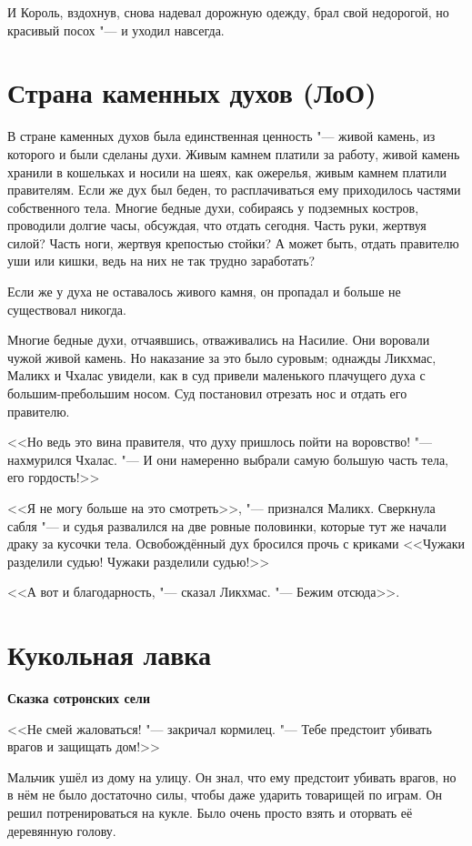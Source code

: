И Король, вздохнув, снова надевал дорожную одежду, брал свой недорогой, но красивый посох "--- и уходил навсегда.

\section{Страна каменных духов (ЛоО)}

В стране каменных духов была единственная ценность "--- живой камень, из которого и были сделаны духи.
Живым камнем платили за работу, живой камень хранили в кошельках и носили на шеях, как ожерелья, живым камнем платили правителям.
Если же дух был беден, то расплачиваться ему приходилось частями собственного тела.
Многие бедные духи, собираясь у подземных костров, проводили долгие часы, обсуждая, что отдать сегодня.
Часть руки, жертвуя силой?
Часть ноги, жертвуя крепостью стойки?
А может быть, отдать правителю уши или кишки, ведь на них не так трудно заработать?

Если же у духа не оставалось живого камня, он пропадал и больше не существовал никогда.

Многие бедные духи, отчаявшись, отваживались на Насилие.
Они воровали чужой живой камень.
Но наказание за это было суровым;
однажды Ликхмас, Маликх и Чхалас увидели, как в суд привели маленького плачущего духа с большим-пребольшим носом.
Суд постановил отрезать нос и отдать его правителю.

<<Но ведь это вина правителя, что духу пришлось пойти на воровство! "--- нахмурился Чхалас.
"--- И они намеренно выбрали самую большую часть тела, его гордость!>>

<<Я не могу больше на это смотреть>>, "--- признался Маликх.
Сверкнула сабля "--- и судья развалился на две ровные половинки, которые тут же начали драку за кусочки тела.
Освобождённый дух бросился прочь с криками <<Чужаки разделили судью! Чужаки разделили судью!>>

<<А вот и благодарность, "--- сказал Ликхмас.
"--- Бежим отсюда>>.

\section{Кукольная лавка}

\textbf{Сказка сотронских сели}

\spacing

<<Не смей жаловаться! "--- закричал кормилец.
"--- Тебе предстоит убивать врагов и защищать дом!>>

Мальчик ушёл из дому на улицу.
Он знал, что ему предстоит убивать врагов, но в нём не было достаточно силы, чтобы даже ударить товарищей по играм.
Он решил потренироваться на кукле.
Было очень просто взять и оторвать её деревянную голову.

